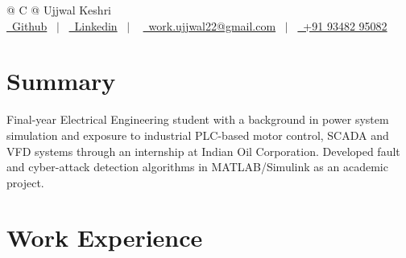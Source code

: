 \documentclass[a4paper,11pt]{article}
\begin{document}
\pagestyle{empty} 



\begin{tabularx}{\linewidth}{@{} C @{}}
\Huge{Ujjwal Keshri} \\[7.5pt]
\href{https://github.com/RustyUjjwal}{\raisebox{-0.05\height}\faGithub\ Github} \ $|$ \ 
\href{https://www.linkedin.com/in/keshriujjwal}{\raisebox{-0.05\height}\faLinkedin\ Linkedin} \ $|$ \ 
\href{mailto:work.ujjwal22@gmail.com}{\raisebox{-0.05\height}\faEnvelope \ work.ujjwal22@gmail.com} \ $|$ \ 
\href{tel:+919348295082}{\raisebox{-0.05\height}\faMobile \ +91 93482 95082} \\
\end{tabularx}


\section{Summary}
Final-year Electrical Engineering student with a background in power system simulation and exposure to industrial PLC-based motor control, SCADA and VFD systems through an internship at Indian Oil Corporation. Developed fault and cyber-attack detection algorithms in MATLAB/Simulink as an academic project.

\section{Work Experience}
\end{document}
